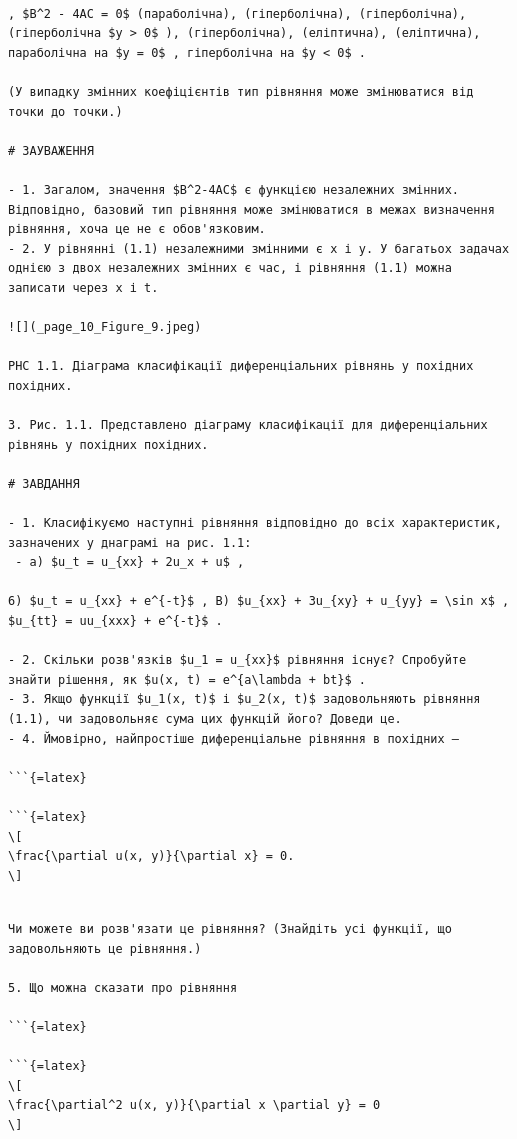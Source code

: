 \documentclass[
]{article}
\begin{document}
\begin{verbatim}

, $B^2 - 4AC = 0$ (параболічна), (гіперболічна), (гіперболічна), (гіперболічна $y > 0$ ), (гіперболічна), (еліптична), (еліптична), параболічна на $y = 0$ , гіперболічна на $y < 0$ .

(У випадку змінних коефіцієнтів тип рівняння може змінюватися від точки до точки.)

# ЗАУВАЖЕННЯ

- 1. Загалом, значення $B^2-4AC$ є функцією незалежних змінних. Відповідно, базовий тип рівняння може змінюватися в межах визначення рівняння, хоча це не є обов'язковим.
- 2. У рівнянні (1.1) незалежними змінними є x і y. У багатьох задачах однією з двох незалежних змінних є час, і рівняння (1.1) можна записати через x і t.

![](_page_10_Figure_9.jpeg)

PHC 1.1. Діаграма класифікації диференціальних рівнянь у похідних похідних.

3. Рис. 1.1. Представлено діаграму класифікації для диференціальних рівнянь у похідних похідних.

# ЗАВДАННЯ

- 1. Класифікуємо наступні рівняння відповідно до всіх характеристик, зазначених у днаграмі на рис. 1.1:
 - a) $u_t = u_{xx} + 2u_x + u$ ,

6) $u_t = u_{xx} + e^{-t}$ , B) $u_{xx} + 3u_{xy} + u_{yy} = \sin x$ , $u_{tt} = uu_{xxx} + e^{-t}$ .

- 2. Скільки розв'язків $u_1 = u_{xx}$ рівняння існує? Спробуйте знайти рішення, як $u(x, t) = e^{a\lambda + bt}$ .
- 3. Якщо функції $u_1(x, t)$ і $u_2(x, t)$ задовольняють рівняння (1.1), чи задовольняє сума цих функцій його? Доведи це.
- 4. Ймовірно, найпростіше диференціальне рівняння в похідних —

```{=latex}

```{=latex}
\[
\frac{\partial u(x, y)}{\partial x} = 0.
\]
\end{verbatim}

\begin{verbatim}

Чи можете ви розв'язати це рівняння? (Знайдіть усі функції, що задовольняють це рівняння.)

5. Що можна сказати про рівняння

```{=latex}

```{=latex}
\[
\frac{\partial^2 u(x, y)}{\partial x \partial y} = 0
\]
\end{verbatim}
\end{document}
